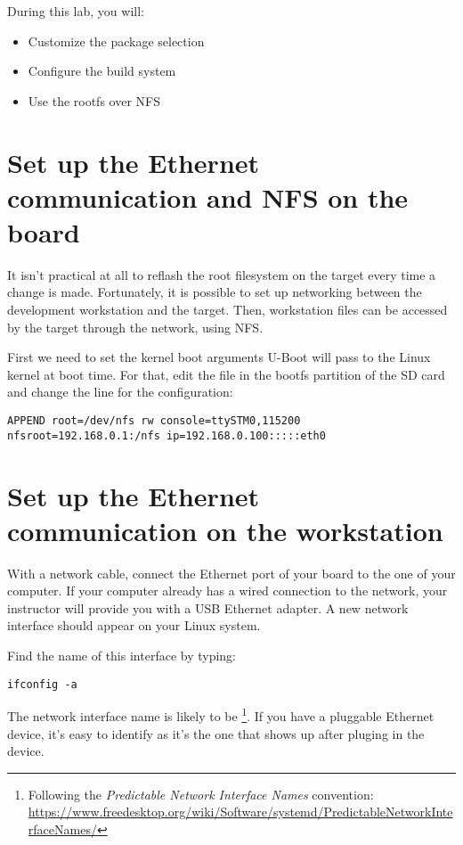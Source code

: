 
During this lab, you will:
\begin{itemize}
  \item Customize the package selection
  \item Configure the build system
  \item Use the rootfs over NFS
\end{itemize}

\section{Set up the Ethernet communication and NFS on the board}

It isn't practical at all to reflash the root filesystem on the target
every time a change is made. Fortunately, it is possible to set up
networking between the development workstation and the target. Then,
workstation files can be accessed by the target through the network,
using NFS.

First we need to set the kernel boot arguments U-Boot will pass to the
Linux kernel at boot time. For that, edit the
 file in the bootfs partition of the SD
card and change the  line for the
 configuration:

\begin{verbatim}
APPEND root=/dev/nfs rw console=ttySTM0,115200 nfsroot=192.168.0.1:/nfs ip=192.168.0.100:::::eth0
\end{verbatim}

\section{Set up the Ethernet communication on the workstation}

With a network cable, connect the Ethernet port of your board to the
one of your computer. If your computer already has a wired connection
to the network, your instructor will provide you with a USB Ethernet
adapter. A new network interface should appear on your Linux system.

Find the name of this interface by typing:
\begin{verbatim}
ifconfig -a
\end{verbatim}

The network interface name is likely to be
\footnote{Following the {\em Predictable Network Interface
Names} convention:
\url{https://www.freedesktop.org/wiki/Software/systemd/PredictableNetworkInterfaceNames/}}.
If you have a pluggable Ethernet device, it's easy to identify as it's
the one that shows up after pluging in the device.

